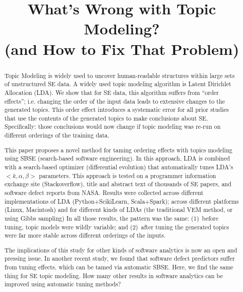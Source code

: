 \documentclass[10pt,conference]{IEEEtran}
\theoremstyle{break}
\begin{document}
\pagestyle{plain}

\title{\textbf{What's Wrong with
Topic Modeling?\\ (and How to Fix That Problem)}}


\author{
\and
{}
\and
{}
}

\maketitle


\begin{abstract}
Topic Modeling is widely used to uncover human-readable structures within large sets of unstructured SE data. A widely used topic modeling algorithm is Latent Dirichlet Allocation (LDA). We show that for SE data, this algorithm suffers
from ``order effects''; i.e. changing the order of the input data leads to extensive changes to the generated topics. This order effect introduces a systematic error
for all prior  studies that use the contents of the generated topics to make 
conclusions about SE. Specifically: those conclusions would now change if topic modeling was re-run on different orderings
of the training data.

This paper proposes a novel method for taming ordering effects with topics modeling using SBSE (search-based software engineering).  In this approach, LDA is combined with a search-based optimizer (differential evolution)
that automatically tunes LDA's $<k,\alpha,\beta>$ parameters. This approach is tested on a programmer information exchange site (Stackoverflow), title and abstract text of
thousands of SE papers, and software defect reports from NASA.    Results were collected across different implementations of LDA (Python+ScikiLearn, Scala+Spark); across different platforms (Linux, Macintosh) and for different kinds of LDAs (the traditional VEM method, or using  Gibbs sampling)
  In all those results, the pattern was the same:  (1)~before tuning, topic models were wildly variable; and (2)~after tuning
  the generated topics were far more stable across different orderings of the inputs. 
  
 
The implications of this study for other kinds
of software analytics is now an open and pressing issue. In another recent study, we   found that software defect predictors
suffer from tuning effects, which can be tamed via automatic SBSE. Here, we find the same thing for SE topic modeling. 
How many other results in software analytics can be improved using automatic tuning methods?
\end{abstract}
\end{document}
